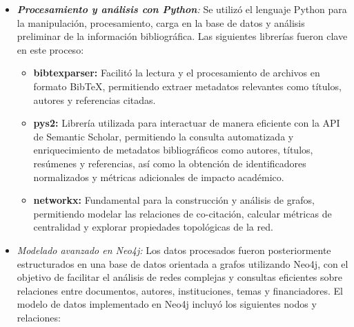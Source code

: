 \documentclass[twoside, twocolumn]{article}
\newcommand{\1}{\mathds{1}}						%
\begin{document}
\begin{enumerate}
    \begin{itemize}
        \item \textit{\textbf{Procesamiento y análisis con Python}:} Se utilizó el lenguaje Python para la manipulación, procesamiento, carga en la base de datos y análisis preliminar de la información bibliográfica. Las siguientes librerías fueron clave en este proceso:
        \begin{itemize}
            \item \textbf{bibtexparser:} Facilitó la lectura y el procesamiento de archivos en formato BibTeX, permitiendo extraer metadatos relevantes como títulos, autores y referencias citadas.
            \item \textbf{pys2:} Librería utilizada para interactuar de manera eficiente con la API de Semantic Scholar, permitiendo la consulta automatizada y enriquecimiento de metadatos bibliográficos como autores, títulos, resúmenes y referencias, así como la obtención de identificadores normalizados y métricas adicionales de impacto académico.
            \item \textbf{networkx:} Fundamental para la construcción y análisis de grafos, permitiendo modelar las relaciones de co-citación, calcular métricas de centralidad y explorar propiedades topológicas de la red.
        \end{itemize}

        \item \textit{Modelado avanzado en Neo4j:} Los datos procesados fueron posteriormente estructurados en una base de datos orientada a grafos utilizando Neo4j, con el objetivo de facilitar el análisis de redes complejas y consultas eficientes sobre relaciones entre documentos, autores, instituciones, temas y financiadores. El modelo de datos implementado en Neo4j incluyó los siguientes nodos y relaciones:


\end{itemize}
\end{enumerate}
\end{document}
